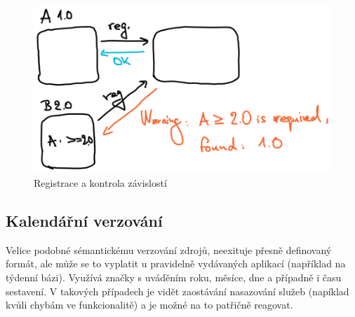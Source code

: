 \begin{figure}[htbp]
   \centering
   \includegraphics[max width=\textwidth]{assets/draft-version-reg}
   \caption{Registrace  a kontrola závislostí}\label{fig:version-reg}
\end{figure}



\subsection{Kalendářní verzování }\label{subsec:msa-dependencies-calendar}

Velice podobné sémantickému verzování zdrojů, neexituje přesně definovaný formát, ale může se to vyplatit u pravidelně vydávaných aplikací (například na týdenní bázi).
Využívá značky s uváděním roku, měsíce, dne a případně i času sestavení.
V takových případech je vidět zaostávání nasazování služeb (napíklad kvůli chybám ve funkcionalitě) a je možné na to patřičně reagovat.~\cite{msversions}

\newpage
